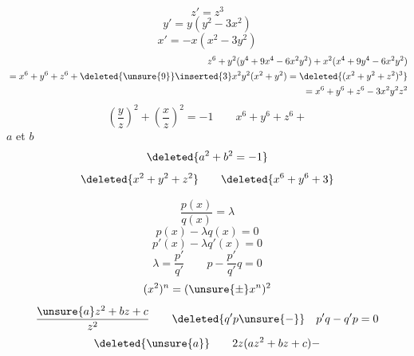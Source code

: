 \[
z'=z^3
\]
\[
y'=y(y^2-3x^2)
\]
\[
x'=-x(x^2-3y^2)
\]
\[
\begin{aligned}
z^6+y^2(y^4+9x^4-6x^2y^2)+x^2(x^4+9y^4-6x^2y^2)\\
{}=x^6+y^6+z^6+\deleted{\unsure{9}}\inserted{3}x^2y^2(x^2+y^2)
=\deleted{(x^2+y^2+z^2)^3}\\
{}=x^6+y^6+z^6-3x^2y^2z^2
\end{aligned}
\]
\[
\left(\frac yz\right)^2+\left(\frac xz\right)^2=-1
\qquad x^6+y^6+z^6+
\]
$a$ et $b$
\[
\deleted{a^2+b^2=-1}
\]
\[
\deleted{x^2+y^2+z^2}\qquad\deleted{x^6+y^6+3}
\]

\[
\frac{p(x)}{q(x)}=\lambda
\]
\[
p(x)-\lambda q(x)=0
\]
\[
p'(x)-\lambda q'(x)=0
\]
\[
\lambda=\frac{p'}{q'}\qquad p-\frac{p'}{q'}q=0
\]
\[
(x^2)^n=(\unsure{\pm}x^n)^2
\]
\[
\frac{\unsure{a}z^2+bz+c}{z^2}\qquad
\deleted{q'p\unsure{-}}\quad p'q-q'p=0
\]
\[
\deleted{\unsure{a}}\qquad 2z(az^2+bz+c)-
\]
